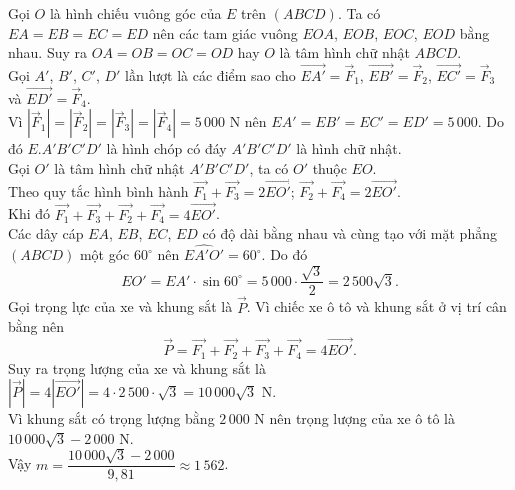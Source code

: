 \begin{ex}
{\begin{center}
		\end{center}
		Gọi $O$ là hình chiếu vuông góc của $E$ trên $(ABCD)$. Ta có $EA=EB=EC=ED$ nên các tam giác vuông $EOA$, $EOB$, $EOC$, $EOD$ bằng nhau. Suy ra $OA=OB=OC=OD$ hay $O$ là tâm hình chữ nhật $ABCD$.\\ 
		Gọi $A'$, $B'$, $C'$, $D'$ lần lượt là các điểm sao cho $\overrightarrow{EA'}=\overrightarrow{F}_1$, $\overrightarrow{EB'}=\overrightarrow{F}_2$, $\overrightarrow{EC'}=\overrightarrow{F}_3$ và $\overrightarrow{ED'}=\overrightarrow{F}_4$.\\
		Vì $\left|\overrightarrow{F}_1\right| = \left|\overrightarrow{F}_2\right| = \left|\overrightarrow{F}_3\right| = \left|\overrightarrow{F}_4\right| = 5\,000$ N nên $EA'=EB'=EC'=ED'=5\,000$. Do đó $E.A'B'C'D'$ là hình chóp có đáy $A'B'C'D'$ là hình chữ nhật.\\
		Gọi $O'$ là tâm hình chữ nhật $A'B'C'D'$, ta có $O'$ thuộc $EO$.\\ 
		Theo quy tắc hình bình hành $\overrightarrow{F_1}+\overrightarrow{F_3}=2\overrightarrow{EO'}$; $\overrightarrow{F_2}+\overrightarrow{F_4}=2\overrightarrow{EO'}$.\\
		Khi đó
		$\overrightarrow{F_1}+\overrightarrow{F_3}+\overrightarrow{F_2}+\overrightarrow{F_4}=4\overrightarrow{EO'}$.\\
		Các dây cáp $EA$, $EB$, $EC$, $ED$ có độ dài bằng nhau và cùng tạo với mặt phẳng $(ABCD)$ một góc $60^\circ$ nên $\widehat{EA'O'}=60^\circ$. Do đó\\
		\[EO'=EA'\cdot\sin 60^\circ=5\, 000\cdot\dfrac{\sqrt{3}}{2}=2\, 500\sqrt{3}.\]
		Gọi trọng lực của xe và khung sắt là $\overrightarrow{P}$. Vì chiếc xe ô tô và khung sắt ở vị trí cân bằng nên 
		\[\overrightarrow{P}=\overrightarrow{F_1}+\overrightarrow{F_2}+\overrightarrow{F_3}+\overrightarrow{F_4} = 4\overrightarrow{EO'}.\]
		Suy ra trọng lượng của xe và khung sắt là $\left|\overrightarrow{P}\right| = 4\left|\overrightarrow{EO'}\right| = 4\cdot 2\,500\cdot \sqrt{3} = 10\,000\sqrt{3}$ N.\\
		Vì khung sắt có trọng lượng bằng $2\,000$ N nên trọng lượng của xe ô tô là $10\,000\sqrt{3}-2\,000$ N.\\
		Vậy $m=\dfrac{10\,000\sqrt{3}-2\,000}{9{,}81}\approx 1\,562$.
	}
\end{ex}

